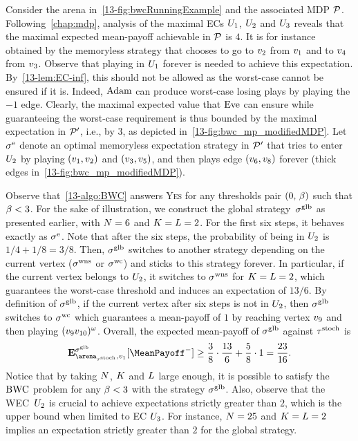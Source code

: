 \begin{example}
Consider the arena in~\cref{13-fig:bwcRunningExample} and the associated MDP ${\mathcal{P}} $. Following~\cref{chap:mdp}, analysis of the maximal ECs $U_{1}$, $U_{2}$ and $U_{3}$ reveals that the maximal expected mean-payoff achievable in ${\mathcal{P}} $ is $4$. It is for instance obtained by the memoryless strategy that chooses to go to $v_{2}$ from $v_{1}$ and to $v_{4}$ from $v_{3}$. Observe that playing in $U_{1}$ forever is needed to achieve this expectation. By~\cref{13-lem:EC-inf}, this should not be allowed as the worst-case cannot be ensured if it is. Indeed, $\text{Adam}$ can produce worst-case losing plays by playing the $-1$ edge. Clearly, the maximal expected value that $\text{Eve}$ can ensure while guaranteeing the worst-case requirement is thus bounded by the maximal expectation in ${\mathcal{P}} '$, i.e., by $3$, as depicted in~\cref{13-fig:bwc_mp_modifiedMDP}. Let $\sigma^{\text{e}}$ denote an optimal memoryless expectation strategy in ${\mathcal{P}} '$ that tries to enter~$U_{2}$ by playing $(v_{1}, v_{2})$ and $(v_{3}, v_{5})$, and then plays edge $(v_{6}, v_{8})$ forever (thick edges in~\cref{13-fig:bwc_mp_modifiedMDP}).



Observe that~\cref{13-algo:BWC} answers \textsc{Yes} for any thresholds pair $(0,\, \beta)$ such that $\beta < 3$. For the sake of illustration, we construct the global strategy~$\sigma^{\text{glb}}$ as presented earlier, with $N = 6$ and $K = L = 2$. For the first six steps, it behaves exactly as $\sigma^{\text{e}}$. Note that after the six steps, the probability of being in $U_{2}$ is $1/4 + 1/8 = 3/8$. Then, $\sigma^{\text{glb}}$ switches to another strategy depending on the current vertex ($\sigma^{\text{wns}}$ or $\sigma^{\text{wc}}$) and sticks to this strategy forever. In particular, if the current vertex belongs to $U_{2}$, it switches to $\sigma^{\text{wns}}$ for $K = L = 2$, which guarantees the worst-case threshold and induces an expectation of $13/6$. By definition of $\sigma^{\text{glb}}$, if the current vertex after six steps is not in $U_{2}$, then $\sigma^{\text{glb}}$ switches to $\sigma^{\text{wc}}$ which guarantees a mean-payoff of $1$ by reaching vertex $v_{9}$ and then playing $(v_{9}v_{10})^{\omega}$. Overall, the expected mean-payoff of $\sigma^{\text{glb}}$ against $\tau^{\text{stoch}} $ is
\begin{equation*}
\expv^{\stratGlobal}_{\arena_{\tau^\text{stoch}},v_{1}}[\MeanPayoff^{-}] \geq \dfrac{3}{8}\cdot\dfrac{13}{6} + \dfrac{5}{8}\cdot 1 = \dfrac{23}{16}.
\end{equation*}
Notice that by taking $N$, $K$ and $L$ large enough, it is possible to satisfy the $\text{BWC}$ problem for any $\beta < 3$ with the strategy $\sigma^{\text{glb}}$. Also, observe that the WEC~$U_{2}$ is crucial to achieve expectations strictly greater than $2$, which is the upper bound when limited to EC $U_{3}$. For instance, $N = 25$ and $K = L = 2$ implies an expectation strictly greater than $2$ for the global strategy.


\end{example}
